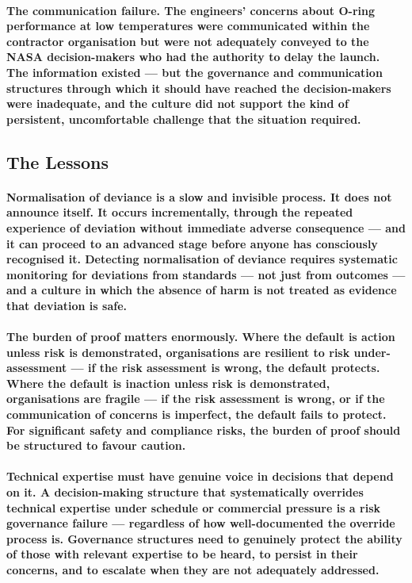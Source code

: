 \paragraph{\textbf{The communication failure}. The engineers' concerns about O-ring performance at low temperatures were communicated within the contractor organisation but were not adequately conveyed to the NASA decision-makers who had the authority to delay the launch. The information existed — but the governance and communication structures through which it should have reached the decision-makers were inadequate, and the culture did not support the kind of persistent, uncomfortable challenge that the situation required.}

\subsection{The Lessons}
\paragraph{\textbf{Normalisation of deviance is a slow and invisible process}. It does not announce itself. It occurs incrementally, through the repeated experience of deviation without immediate adverse consequence — and it can proceed to an advanced stage before anyone has consciously recognised it. Detecting normalisation of deviance requires systematic monitoring for deviations from standards — not just from outcomes — and a culture in which the absence of harm is not treated as evidence that deviation is safe.}
\paragraph{\textbf{The burden of proof matters enormously}. Where the default is action unless risk is demonstrated, organisations are resilient to risk under-assessment — if the risk assessment is wrong, the default protects. Where the default is inaction unless risk is demonstrated, organisations are fragile — if the risk assessment is wrong, or if the communication of concerns is imperfect, the default fails to protect. For significant safety and compliance risks, the burden of proof should be structured to favour caution.}
\paragraph{\textbf{Technical expertise must have genuine voice in decisions that depend on it}. A decision-making structure that systematically overrides technical expertise under schedule or commercial pressure is a risk governance failure — regardless of how well-documented the override process is. Governance structures need to genuinely protect the ability of those with relevant expertise to be heard, to persist in their concerns, and to escalate when they are not adequately addressed.}

